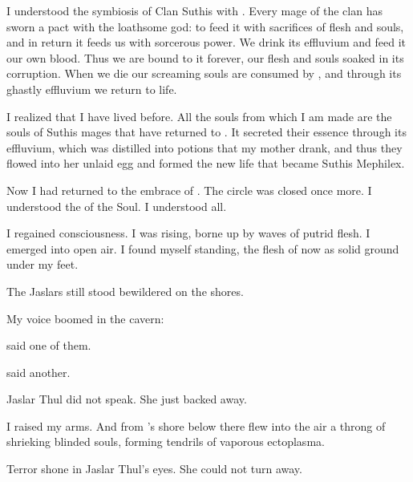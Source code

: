 \documentclass
  [a4paper,
   12pt,
   oneside
  ]%
  {article}
\begin{document}
I understood the symbiosis of Clan Suthis with \Ubloth. 
Every mage of the clan has sworn a pact with the loathsome god: to feed it with sacrifices of flesh and souls, and in return it feeds us with sorcerous power.  
We drink its effluvium and feed it our own blood. 
Thus we are bound to it forever, our flesh and souls soaked in its corruption. 
When we die our screaming souls are consumed by \Ubloth, and through its ghastly effluvium we return to life. 

% 

I realized that I have lived before. 
All the souls from which I am made are the souls of Suthis mages that have returned to \Ubloth.
It secreted their essence through its effluvium, which was distilled into potions that my mother drank, and thus they flowed into her unlaid egg and formed the new life that became Suthis Mephilex. 

Now I had returned to the embrace of \Ubloth. 
The circle was closed once more. 
I understood the \Arcanum of the Soul. 
I understood all. 

I regained consciousness. 
I was rising, borne up by waves of putrid flesh.
I emerged into open air.
I found myself standing, the flesh of \Ubloth now as solid ground under my feet. 

The Jaslars still stood bewildered on the shores.

My voice boomed in the cavern:

 said one of them.

 said another.

Jaslar Thul did not speak. 
She just backed away.

I raised my arms. 
And from \Ubloth's shore below there flew into the air a throng of shrieking blinded souls, forming tendrils of vaporous ectoplasma. 

Terror shone in Jaslar Thul's eyes. 
She could not turn away. 
\end{document}
